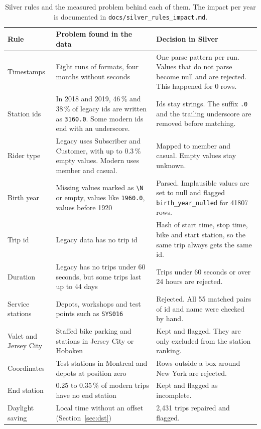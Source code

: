 \documentclass[11pt,a4paper]{article}
\newcommand{\code}[1]{\texttt{\small #1}}
\begin{document}
\begin{table}[tbp]
\small
\begin{tabularx}{\linewidth}{@{}p{2.7cm}LL@{}}
\toprule
Rule & Problem found in the data & Decision in Silver \\
\midrule
Timestamps & Eight runs of formats, four months without seconds & One parse pattern per run. Values that do not parse
  become null and are rejected. This happened for 0 rows. \\
Station ids & In 2018 and 2019, 46\,\% and 38\,\% of legacy ids are written as \code{3160.0}. Some modern ids end
  with an underscore. & Ids stay strings. The suffix \code{.0} and the trailing underscore are removed before matching. \\
Rider type & Legacy uses Subscriber and Customer, with up to 0.3\,\% empty values. Modern uses member and casual. & Mapped
  to member and casual. Empty values stay unknown. \\
Birth year & Missing values marked as \code{\textbackslash N} or empty, values like \code{1960.0}, values before 1920 & Parsed.
  Implausible values are set to null and flagged \code{birth\_year\_nulled} for \num{41807} rows. \\
Trip id & Legacy data has no trip id & Hash of start time, stop time, bike and start station, so the same trip always gets
  the same id. \\
Duration & Legacy has no trips under 60 seconds, but some trips last up to 44 days & Trips under 60 seconds or over 24 hours
  are rejected. \\
Service stations & Depots, workshops and test points such as \code{SYS016} & Rejected. All 55 matched pairs of id and name
  were checked by hand. \\
Valet and Jersey City & Staffed bike parking and stations in Jersey City or Hoboken & Kept and flagged. They are only
  excluded from the station ranking. \\
Coordinates & Test stations in Montreal and depots at position zero & Rows outside a box around New York are
  rejected. \\
End station & 0.25 to 0.35\,\% of modern trips have no end station & Kept and flagged as incomplete. \\
Daylight saving & Local time without an offset (Section~\ref{sec:dst}) & 2,431 trips repaired and flagged. \\
\bottomrule
\end{tabularx}
\caption{Silver rules and the measured problem behind each of them. The impact per year is documented in
\code{docs/silver\_rules\_impact.md}.}
\label{tab:rules}
\end{table}
\end{document}
